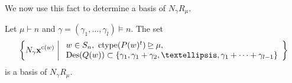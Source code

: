 \documentclass[10pt]{amsart}
\theoremstyle{plain}
\theoremstyle{definition}
\theoremstyle{plain}
\theoremstyle{plain}
\theoremstyle{remark}
\theoremstyle{plain}
\theoremstyle{plain}
\DeclareMathOperator{\ctype}{ctype}
\DeclareMathOperator{\cw}{c}
\DeclareMathOperator{\des}{Des}
\begin{document}
We now use this fact to determine a basis of $N_\gamma R_{\mu}$.
\begin{prop2}
\makeatletter{}\makeatother
\label{prop:prop2}

    Let $\mu \vdash n$  and $\gamma = (\gamma_1,\dots, \gamma_l)\models n$. 
    The set
    \begin{align}\label{eq:antisym basis}
    \left\{ N_\gamma \mathbf{x}^{\cw(w)} \biggm|
    \begin{array}{l}  w \in S_n, \ \ctype(P(w)^t) \unrhd\mu, \\
      \des(Q(w)) \subset \{\gamma_1,\gamma_1 + \gamma_2, \dots, \gamma_1 + \cdots + \gamma_{l-1}\}
    \end{array}
    \right\}
    \end{align}
    is
    a basis of $N_\gamma R_{\mu}$.
\end{prop2}
\end{document}
